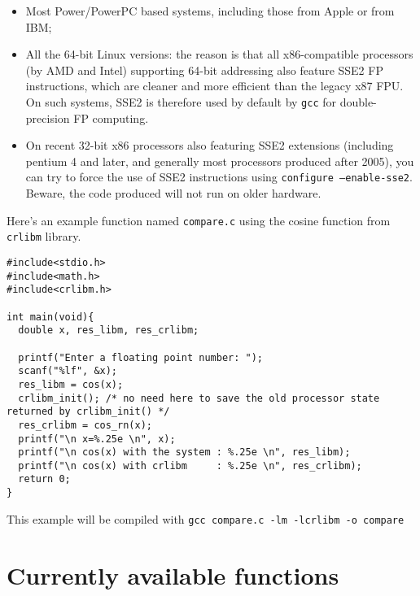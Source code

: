 \begin{itemize}
\item Most Power/PowerPC based systems, including those from Apple or from IBM;
\item All the 64-bit Linux versions: the reason is that all
  x86-compatible processors (by AMD and Intel) supporting 64-bit
  addressing also feature SSE2 FP instructions, which are cleaner and
  more efficient than the legacy x87 FPU. On such systems, SSE2 is
  therefore used by default by \texttt{gcc} for double-precision FP
  computing.
\item On recent 32-bit x86 processors also featuring SSE2 extensions
  (including pentium 4 and later, and generally most processors
  produced after 2005), you can try to force the use of SSE2
  instructions using \texttt{configure --enable-sse2}. Beware, the
  code produced will not run on older hardware.
\end{itemize}

Here's an example function named \texttt{compare.c} using the cosine
function from \texttt{crlibm} library.

\begin{lstlisting}[label={chap0:lst:prog_example},caption={compare.c},firstnumber=1]
#include<stdio.h>
#include<math.h>
#include<crlibm.h>

int main(void){
  double x, res_libm, res_crlibm;

  printf("Enter a floating point number: ");
  scanf("%lf", &x);
  res_libm = cos(x);
  crlibm_init(); /* no need here to save the old processor state returned by crlibm_init() */
  res_crlibm = cos_rn(x);
  printf("\n x=%.25e \n", x);
  printf("\n cos(x) with the system : %.25e \n", res_libm);
  printf("\n cos(x) with crlibm     : %.25e \n", res_crlibm);
  return 0;
}
\end{lstlisting}

This example will be compiled with \texttt{gcc compare.c -lm -lcrlibm -o compare}


\section{Currently available functions}

